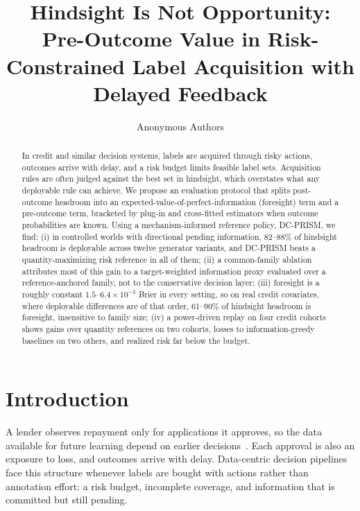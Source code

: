 \documentclass[runningheads]{llncs}
\begin{document}
\title{Hindsight Is Not Opportunity: Pre-Outcome Value in Risk-Constrained Label Acquisition with Delayed Feedback}
\author{Anonymous Authors}
\maketitle
\begin{abstract}
In credit and similar decision systems, labels are acquired through risky actions, outcomes arrive with delay, and a risk budget limits feasible label sets. Acquisition rules are often judged against the best set in hindsight, which overstates what any deployable rule can achieve. We propose an evaluation protocol that splits post-outcome headroom into an expected-value-of-perfect-information (foresight) term and a pre-outcome term, bracketed by plug-in and cross-fitted estimators when outcome probabilities are known. Using a mechanism-informed reference policy, DC-PRISM, we find: (i) in controlled worlds with directional pending information, 82--88\% of hindsight headroom is deployable across twelve generator variants, and DC-PRISM beats a quantity-maximizing risk reference in all of them; (ii) a common-family ablation attributes most of this gain to a target-weighted information proxy evaluated over a reference-anchored family, not to the conservative decision layer; (iii) foresight is a roughly constant $1.5$--$6.4\times10^{-3}$ Brier in every setting, so on real credit covariates, where deployable differences are of that order, 61--90\% of hindsight headroom is foresight, insensitive to family size; (iv) a power-driven replay on four credit cohorts shows gains over quantity references on two cohorts, losses to information-greedy baselines on two others, and realized risk far below the budget.
\end{abstract}

\section{Introduction}
\label{sec:intro}
A lender observes repayment only for applications it approves, so the data available for future learning depend on earlier decisions~\cite{lakkaraju2017selective,wei2021selective}. Each approval is also an exposure to loss, and outcomes arrive with delay. Data-centric decision pipelines face this structure whenever labels are bought with actions rather than annotation effort: a risk budget, incomplete coverage, and information that is committed but still pending.
\end{document}
